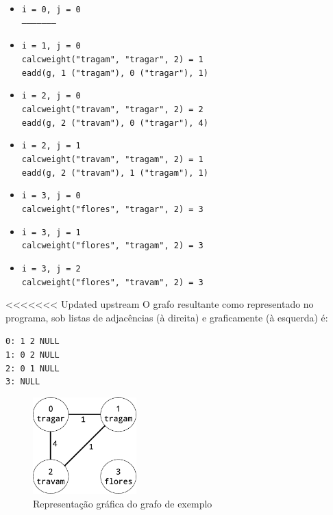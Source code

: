 \documentclass[portuguese, a4paper]{article}
\newcommand\tu[0]{\textunderscore}
\begin{document}
	\begin{itemize}
		\item
			\texttt{i = 0, j = 0} \\
			\texttt{---------------------}
		\item
			\texttt{i = 1, j = 0} \\
			\texttt{calc\tu weight("tragam", "tragar", 2) = 1} \\
			\texttt{e\tu add(g, 1 ("tragam"), 0 ("tragar"), 1)}
		\item
			\texttt{i = 2, j = 0} \\
			\texttt{calc\tu weight("travam", "tragar", 2) = 2} \\
			\texttt{e\tu add(g, 2 ("travam"), 0 ("tragar"), 4)}
		\item
			\texttt{i = 2, j = 1} \\
			\texttt{calc\tu weight("travam", "tragam", 2) = 1} \\
			\texttt{e\tu add(g, 2 ("travam"), 1 ("tragam"), 1)}
		\item
			\texttt{i = 3, j = 0} \\
			\texttt{calc\tu weight("flores", "tragar", 2) = 3}
		\item
			\texttt{i = 3, j = 1} \\
			\texttt{calc\tu weight("flores", "tragam", 2) = 3}
		\item
			\texttt{i = 3, j = 2} \\
			\texttt{calc\tu weight("flores", "travam", 2) = 3}
	\end{itemize}
	\par
<<<<<<< Updated upstream
	O grafo resultante como representado no programa, sob listas de adjacências
	(à direita) e graficamente (à esquerda) é: \\
	\begin{minipage}{\linewidth}
		\centering
		\begin{minipage}{0.45\linewidth}
		\begin{center}
			\texttt{0: 1 \textrightarrow{} 2 \textrightarrow{} NULL \\
					1: 0 \textrightarrow{} 2 \textrightarrow{} NULL \\
					2: 0 \textrightarrow{} 1 \textrightarrow{} NULL \\
					3: NULL}
		\end{center}
		\end{minipage}
		\hspace{0.05\linewidth}
		\begin{minipage}{0.45\linewidth}
			\begin{figure}[H]
				\centering
				\includegraphics[width=4cm]{graph}
				\caption{Representação gráfica do grafo de exemplo}
			\end{figure}
		\end{minipage}
	\end{minipage} \\
\end{document}
